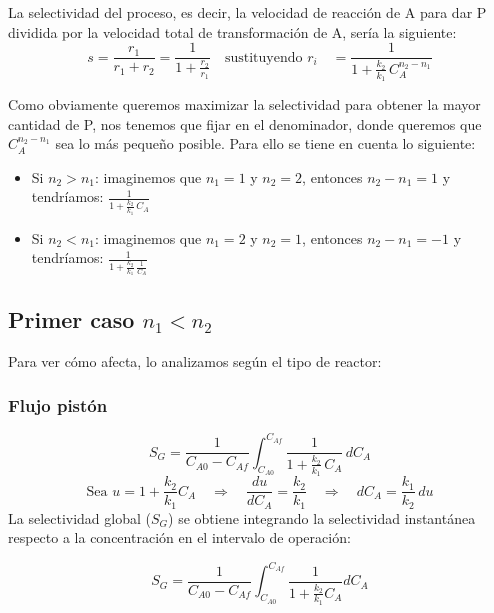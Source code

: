 \begin{flushleft}
  La selectividad del proceso, es decir, la velocidad de reacción de A para dar P dividida por la velocidad total de transformación de A, sería la siguiente:
  \begin{equation}
    s = \frac{r_1}{r_1 + r_2}
    = \frac{1}{1 + \frac{r_2}{r_1}}
    \quad \text{sustituyendo } r_i \quad
    = \frac{1}{1 + \frac{k_2}{k_1} \, C_A^{n_2 - n_1}}
  \end{equation}
\end{flushleft}
\noindent Como obviamente queremos maximizar la selectividad para obtener la mayor cantidad de P, nos tenemos que fijar en el denominador, donde queremos que $C_A^{n_2-n_1}$ sea lo más pequeño posible. Para ello se tiene en cuenta lo siguiente:
\begin{itemize}
  \item Si $n_2 > n_1$: imaginemos que $n_1 = 1$ y $n_2 = 2$, entonces $n_2 - n_1 = 1$ y tendríamos: $\frac{1}{1 + \frac{k_2}{k_1} \, C_A}$
  \item Si $n_2 < n_1$: imaginemos que $n_1 = 2$ y $n_2 = 1$, entonces $n_2 - n_1 = -1$ y tendríamos: $\frac{1}{1 + \frac{k_2}{k_1} \, \frac{1}{C_A}}$
\end{itemize}
\subsection{Primer caso $n_1 < n_2$}
\noindent Para ver cómo afecta, lo analizamos según el tipo de reactor:
\subsubsection{Flujo pistón}
\begin{equation}
  S_G= \frac{1}{C_{A0}-C_{Af}}
  \int_{C_{A0}}^{C_{Af}} \frac{1}{1 + \frac{k_2}{k_1} \, C_A}\, dC_A
\end{equation}
\begin{equation}
  \text{Sea } u = 1 + \frac{k_2}{k_1} C_A
  \quad \Rightarrow \quad
  \frac{du}{dC_A} = \frac{k_2}{k_1}
  \quad \Rightarrow \quad
  dC_A = \frac{k_1}{k_2} \, du
\end{equation}
\noindent La selectividad global ($S_G$) se obtiene integrando la selectividad instantánea respecto a la concentración en el intervalo de operación:

\begin{equation}
  S_G = \frac{1}{C_{A0}-C_{Af}} \int_{C_{A0}}^{C_{Af}} \frac{1}{1 + \frac{k_2}{k_1} C_A} dC_A
\end{equation}

